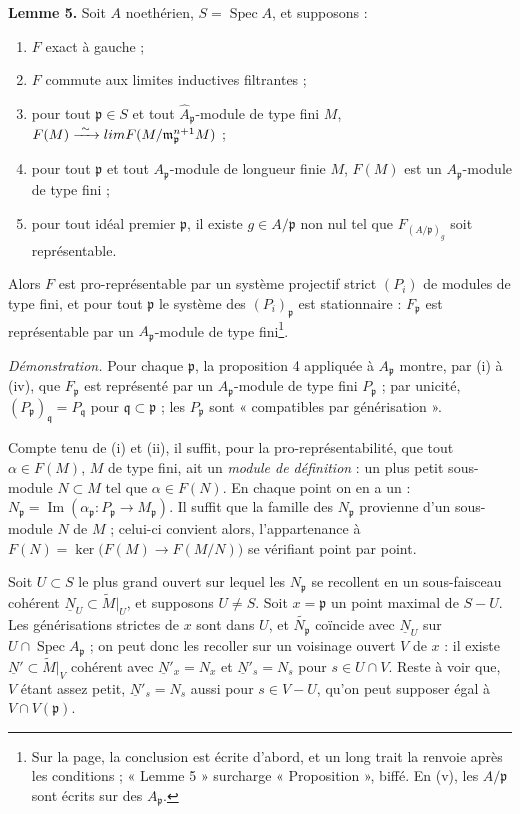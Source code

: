 \documentclass[11pt,a4paper]{article}
\begin{document}
\textbf{Lemme 5.} Soit $A$ noethérien, $S = \operatorname{Spec} A$, et
supposons :
\begin{enumerate}
\item[(i)] $F$ exact à gauche ;
\item[(ii)] $F$ commute aux limites inductives filtrantes ;
\item[(iii)] pour tout $\mathfrak{p} \in S$ et tout
$\widehat{A}_{\mathfrak{p}}$-module de type fini $M$,
$F(M) \xrightarrow{\ \sim\ } \varprojlim F(M/\mathfrak{m}_{\mathfrak{p}}^{n+1}M)$ ;
\item[(iv)] pour tout $\mathfrak{p}$ et tout $A_{\mathfrak{p}}$-module de
longueur finie $M$, $F(M)$ est un $A_{\mathfrak{p}}$-module de type fini ;
\item[(v)] pour tout idéal premier $\mathfrak{p}$, il existe
$g \in A/\mathfrak{p}$ non nul tel que $F_{(A/\mathfrak{p})_g}$ soit
représentable.
\end{enumerate}
Alors $F$ est pro-représentable par un système projectif strict $(P_i)$ de
modules de type fini, et pour tout $\mathfrak{p}$ le système des
$(P_i)_{\mathfrak{p}}$ est stationnaire : $F_{\mathfrak{p}}$ est représentable
par un $A_{\mathfrak{p}}$-module de type fini\footnote{Sur la page, la
conclusion est écrite d'abord, et un long trait la renvoie après les
conditions ; « Lemme 5 » surcharge « Proposition », biffé. En (v), les
$A/\mathfrak{p}$ sont écrits sur des $A_{\mathfrak{p}}$.}.

\emph{Démonstration.} Pour chaque $\mathfrak{p}$, la proposition 4 appliquée à
$A_{\mathfrak{p}}$ montre, par (i) à (iv), que $F_{\mathfrak{p}}$ est
représenté par un $A_{\mathfrak{p}}$-module de type fini $P_{\mathfrak{p}}$ ;
par unicité, $(P_{\mathfrak{p}})_{\mathfrak{q}} = P_{\mathfrak{q}}$ pour
$\mathfrak{q} \subset \mathfrak{p}$ ; les $P_{\mathfrak{p}}$ sont
« compatibles par générisation ».

Compte tenu de (i) et (ii), il suffit, pour la pro-représentabilité, que tout
$\alpha \in F(M)$, $M$ de type fini, ait un \emph{module de définition} : un
plus petit sous-module $N \subset M$ tel que $\alpha \in F(N)$. En chaque point
on en a un : $N_{\mathfrak{p}} = \operatorname{Im}(\alpha_{\mathfrak{p}} \colon
P_{\mathfrak{p}} \to M_{\mathfrak{p}})$. Il suffit que la famille des
$N_{\mathfrak{p}}$ provienne d'un sous-module $N$ de $M$ ; celui-ci convient
alors, l'appartenance à $F(N) = \ker\bigl(F(M) \to F(M/N)\bigr)$ se vérifiant
point par point.

Soit $U \subset S$ le plus grand ouvert sur lequel les $N_{\mathfrak{p}}$ se
recollent en un sous-faisceau cohérent $\underline{N}_U \subset
\widetilde{M}|_U$, et supposons $U \neq S$. Soit $x = \mathfrak{p}$ un point
maximal de $S - U$. Les générisations strictes de $x$ sont dans $U$, et
$\widetilde{N_{\mathfrak{p}}}$ coïncide avec $\underline{N}_U$ sur
$U \cap \operatorname{Spec} A_{\mathfrak{p}}$ ; on peut donc les recoller sur
un voisinage ouvert $V$ de $x$ : il existe $\underline{N}' \subset
\widetilde{M}|_V$ cohérent avec $\underline{N}'_x = N_x$ et
$\underline{N}'_s = N_s$ pour $s \in U \cap V$. Reste à voir que, $V$ étant
assez petit, $\underline{N}'_s = N_s$ aussi pour $s \in V - U$, qu'on peut
supposer égal à $V \cap V(\mathfrak{p})$.
\end{document}
